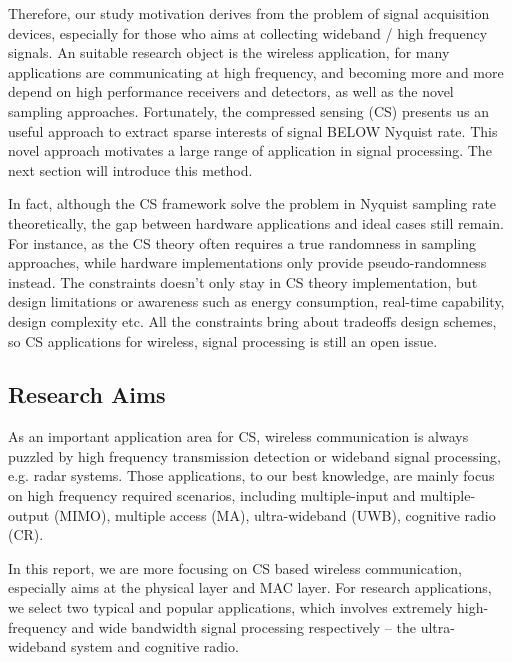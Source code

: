 Therefore, our study motivation derives from the problem of signal acquisition devices, especially for those who aims at collecting wideband / high frequency signals. An suitable research object is the wireless application, for many applications are communicating at high frequency, and becoming more and more depend on high performance receivers and detectors, as well as the novel sampling approaches. Fortunately, the compressed sensing (CS) presents us an useful approach to extract sparse interests of signal BELOW Nyquist rate. This novel approach motivates a large range of application in signal processing. The next section will introduce this method. 

In fact, although the CS framework solve the problem in Nyquist sampling rate theoretically, the gap between hardware applications and ideal cases still remain. For instance, as the CS theory often requires a true randomness in sampling approaches, while hardware implementations only provide pseudo-randomness instead. The constraints doesn't only stay in CS theory implementation, but design limitations or awareness such as energy consumption, real-time capability, design complexity etc. All the constraints bring about tradeoffs design schemes, so CS applications for wireless, signal processing is still an open issue. 

\subsection{Research Aims}
\indent \indent As an important application area for CS, wireless communication is always puzzled by high frequency transmission detection or wideband signal processing, e.g. radar systems. Those applications, to our best knowledge, are mainly focus on high frequency required scenarios, including multiple-input and multiple-output (MIMO), multiple access (MA), ultra-wideband (UWB), cognitive radio (CR).

In this report, we are more focusing on CS based wireless communication, especially aims at the physical layer and MAC layer. For research applications, we select two typical and popular applications, which  involves extremely high-frequency and wide bandwidth signal processing respectively -- the ultra-wideband  system and cognitive radio. 

